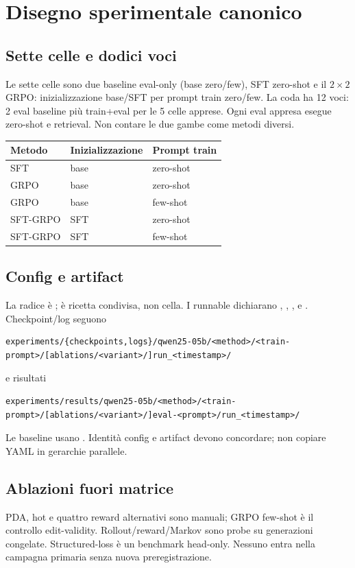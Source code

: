 \chapter{Disegno sperimentale canonico}\label{chap:experiments}
\section{Sette celle e dodici voci}
Le sette celle sono due baseline eval-only (base zero/few), SFT zero-shot e il
$2\times2$ GRPO: inizializzazione base/SFT per prompt train zero/few. La coda ha
12 voci: 2 eval baseline più train+eval per le 5 celle apprese. Ogni eval appresa
esegue zero-shot e retrieval. Non contare le due gambe come metodi diversi.

\begin{center}\begin{tabular}{lll}\toprule
Metodo & Inizializzazione & Prompt train\\\midrule
SFT & base & zero-shot\\
GRPO & base & zero-shot\\
GRPO & base & few-shot\\
SFT-GRPO & SFT & zero-shot\\
SFT-GRPO & SFT & few-shot\\\bottomrule
\end{tabular}\end{center}

\section{Config e artifact}
La radice è ;  è
ricetta condivisa, non cella. I runnable dichiarano ,
, ,  e
. Checkpoint/log seguono
\begin{lstlisting}
experiments/{checkpoints,logs}/qwen25-05b/<method>/<train-prompt>/[ablations/<variant>/]run_<timestamp>/
\end{lstlisting}
e risultati
\begin{lstlisting}
experiments/results/qwen25-05b/<method>/<train-prompt>/[ablations/<variant>/]eval-<prompt>/run_<timestamp>/
\end{lstlisting}
Le baseline usano . Identità config e artifact
devono concordare; non copiare YAML in gerarchie parallele.

\section{Ablazioni fuori matrice}
PDA, hot e quattro reward alternativi sono manuali; GRPO few-shot è il controllo edit-validity. Rollout/reward/Markov sono probe su
generazioni congelate. Structured-loss è un benchmark head-only. Nessuno entra
nella campagna primaria senza nuova preregistrazione.
